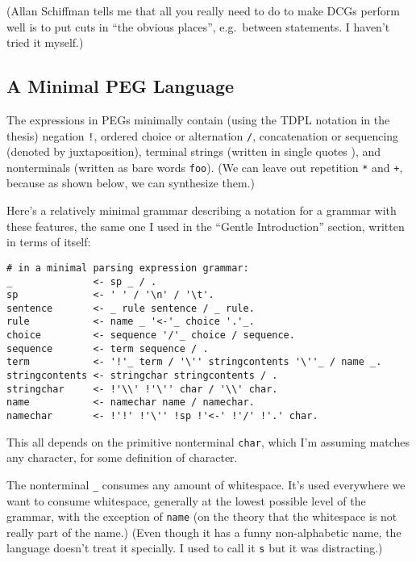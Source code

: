 \documentclass[
]{article}
\begin{document}
(Allan Schiffman tells me that all you really need to do to make DCGs
perform well is to put cuts in ``the obvious places'', e.g.~between
statements. I haven't tried it myself.)

\hypertarget{a-minimal-peg-language}{%
\subsection{A Minimal PEG Language}\label{a-minimal-peg-language}}

The expressions in PEGs minimally contain (using the TDPL notation in
the thesis) negation \texttt{!}, ordered choice or alternation
\texttt{/}, concatenation or sequencing (denoted by juxtaposition),
terminal strings (written in single quotes
\texttt{\textquotesingle{}\textquotesingle{}}), and nonterminals
(written as bare words \texttt{foo}). (We can leave out repetition
\texttt{*} and \texttt{+}, because as shown below, we can synthesize
them.)

Here's a relatively minimal grammar describing a notation for a grammar
with these features, the same one I used in the ``Gentle Introduction''
section, written in terms of itself:

\begin{verbatim}
# in a minimal parsing expression grammar:
_              <- sp _ / .
sp             <- ' ' / '\n' / '\t'.
sentence       <- _ rule sentence / _ rule.
rule           <- name _ '<-'_ choice '.'_.
choice         <- sequence '/'_ choice / sequence.
sequence       <- term sequence / .
term           <- '!'_ term / '\'' stringcontents '\''_ / name _.
stringcontents <- stringchar stringcontents / .
stringchar     <- !'\\' !'\'' char / '\\' char.
name           <- namechar name / namechar.
namechar       <- !'!' !'\'' !sp !'<-' !'/' !'.' char.
\end{verbatim}

This all depends on the primitive nonterminal \texttt{char}, which I'm
assuming matches any character, for some definition of character.

The nonterminal \texttt{\_} consumes any amount of whitespace. It's used
everywhere we want to consume whitespace, generally at the lowest
possible level of the grammar, with the exception of \texttt{name} (on
the theory that the whitespace is not really part of the name.) (Even
though it has a funny non-alphabetic name, the language doesn't treat it
specially. I used to call it \texttt{s} but it was distracting.)
\end{document}
